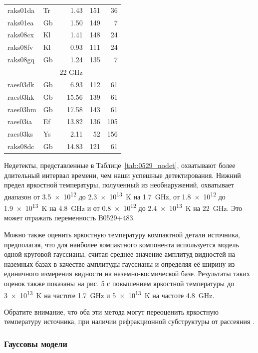 \begin{table}
\begin{SingleSpace}
\begin{tabular}{llrrr}
raks01da & Tr &  1.43 & 151 &  36 \\
raks01ea & Gb &  1.50 & 149 &   7 \\
raks08cx & Kl &  1.41 & 148 &  24 \\
raks08fv & Kl &  0.93 & 111 &  24 \\
raks08gq & Gb &  1.24 & 135 &   7 \\
\midrule
& & 22 GHz & & \\
\midrule
raes03dk & Gb &  6.93 & 112 &  61 \\
raes03hk & Gb & 15.56 & 139 &  61 \\
raes03hm & Gb & 17.58 & 143 &  61 \\
raes03ia & Ef & 13.82 & 136 & 105 \\
raes03ks & Ys &  2.11 &  52 & 156 \\
raks08dc & Gb & 14.83 & 121 &  61 \\
\bottomrule
\end{tabular}
\end{SingleSpace}
\end{table}

Недетекты, представленные в Таблице~\ref{tab:0529_nodet}, охватывают более длительный интервал
времени, чем наши
успешные детектирования. Нижний предел яркостной температуры, полученный из необнаружений,
охватывает диапазон от \num{3.5e12} до \SI{2.3e13}{\kelvin} на \SI{1.7}{\GHz}, от \num{1.8e12} до
\SI{1.9e13}{\kelvin} на \SI{4.8}{\GHz} и от \num{0.8e12} до \SI{2.4e13}{\kelvin} на \SI{22}{\GHz}.
Это может отражать переменность B0529+483.

Можно также оценить яркостную температуру компактной детали источника, предполагая, что для
наиболее компактного компонента используется модель одной круговой гауссианы, считая среднее
значение амплитуд видностей на наземных базах в качестве амплитуды гауссианы и определяя её
ширину из единичного измерения видности на наземно-космической базе. Результаты таких оценок также
показаны на рис. 5 с повышением яркостной температуры до \SI{3e13}{\kelvin} на частоте
\SI{1.7}{\GHz} и \SI{5e13}{\kelvin} на частоте \SI{4.8}{\GHz}.

Обратите внимание, что оба эти метода могут переоценить яркостную температуру источника, при
наличии рефракционной субструктуры от рассеяния \cite{Johnson_2015,Johnson_2016}.

\subsubsection{Гауссовы модели}

